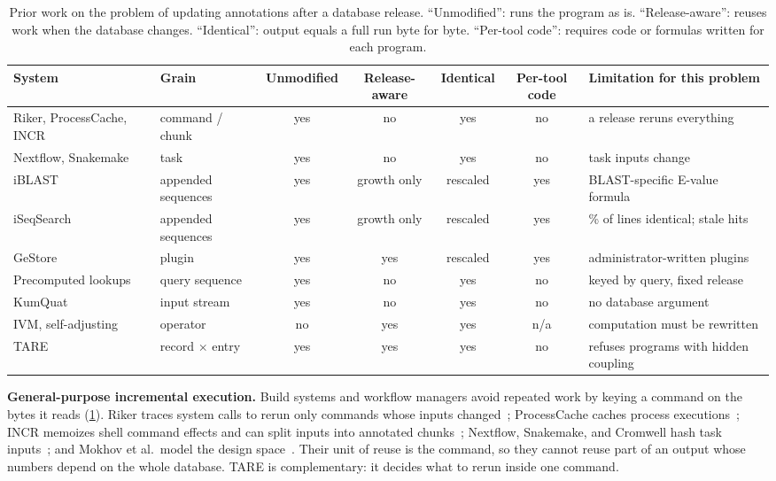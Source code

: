 \documentclass[letterpaper,twocolumn,10pt]{article}
\theoremstyle{definition}
\newcommand{\sys}{TARE\xspace}
\begin{document}
\begin{table}[t]
\caption{Prior work on the problem of updating annotations after a database release. ``Unmodified'': runs the program as
is. ``Release-aware'': reuses work when the database changes. ``Identical'': output equals a full run byte for byte.
``Per-tool code'': requires code or formulas written for each program.}
\label{tab:prior}
\centering\footnotesize
\setlength{\tabcolsep}{3.5pt}
\begin{tabular}{@{}llcccc>{\raggedright\arraybackslash}p{3.6cm}@{}}
\toprule
System & Grain & Unmodified & Release-aware & Identical & Per-tool code & Limitation for this problem \\
\midrule
Riker, ProcessCache, INCR~\cite{curtsinger2022riker,shiptoski2023processcache,xie2026incr} & command / chunk & yes & no & yes & no & a release reruns everything \\
Nextflow, Snakemake~\cite{ditommaso2017nextflow,molder2021snakemake} & task & yes & no & yes & no & task inputs change \\
iBLAST~\cite{dash2021iblast} & appended sequences & yes & growth only & rescaled & yes & BLAST-specific E-value formula \\
iSeqSearch~\cite{yoo2025iseqsearch} & appended sequences & yes & growth only & rescaled & yes & 1.3\% of lines identical; stale hits \\
GeStore~\cite{pedersen2014gestore} & plugin & yes & yes & rescaled & yes & administrator-written plugins \\
Precomputed lookups~\cite{jones2014interproscan,cantalapiedra2021eggnog} & query sequence & yes & no & yes & no & keyed by query, fixed release \\
KumQuat~\cite{shen2022kumquat} & input stream & yes & no & yes & no & no database argument \\
IVM, self-adjusting~\cite{blakeley1986views,acar2003selective} & operator & no & yes & yes & n/a & computation must be rewritten \\
\sys & record $\times$ entry & yes & yes & yes & no & refuses programs with hidden coupling \\
\bottomrule
\end{tabular}
\end{table}

\textbf{General-purpose incremental execution.} Build systems and workflow managers avoid repeated work by keying a command
on the bytes it reads (\cref{tab:prior}). Riker traces system calls to rerun only commands whose inputs
changed~\cite{curtsinger2022riker}; ProcessCache caches process executions~\cite{shiptoski2023processcache}; INCR memoizes
shell command effects and can split inputs into annotated chunks~\cite{xie2026incr}; Nextflow, Snakemake, and Cromwell hash
task inputs~\cite{ditommaso2017nextflow,molder2021snakemake,cromwell-call-cache}; and Mokhov et al.\ model the design
space~\cite{mokhov2018buildsystems}. Their unit of reuse is the command, so they cannot reuse part of an output whose
numbers depend on the whole database. \sys is complementary: it decides what to rerun inside one command.
\end{document}

